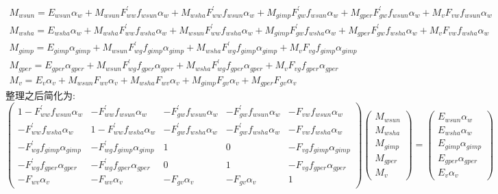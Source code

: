 \begin{landscape}
\begin{equation}
\begin{array}{l}M_{wsun}=E_{wsun} \alpha_{w}+M_{wsun} F_{ww}^{\prime} f_{wsun} \alpha_{w}+M_{wsha} F_{ww}^{\prime} f_{wsun} \alpha_{w}+M_{gimp} F_{g w}^{\prime} f_{wsun} \alpha_{w}+M_{gper} F_{g w}^{\prime} f_{wsun} \alpha_{w}+M_{v} F_{v w} f_{wsun} \alpha_{w} \\ M_{wsha}=E_{wsha} \alpha_{w}+M_{wsha} F_{ww}^{\prime} f_{wsha} \alpha_{w}+M_{wsun} F_{ww}^{\prime} f_{wsha} \alpha_{w}+M_{gimp} F_{g w}^{\prime} f_{wsha} \alpha_{w}+M_{gper} F_{g w}^{\prime} f_{wsha} \alpha_{w}+M_{v} F_{v w} f_{wsha} \alpha_{w} \\ M_{gimp}=E_{gimp} \alpha_{gimp}+M_{wsun} F_{w g}^{\prime} f_{gimp} \alpha_{gimp}+M_{wsha} F_{w g}^{\prime} f_{gimp} \alpha_{gimp}+M_{v} F_{v g} f_{gimp} \alpha_{gimp} \\ M_{gper}=E_{gper} \alpha_{gper}+M_{wsun} F_{w g}^{\prime} f_{gper} \alpha_{gper}+M_{wsha} F_{w g}^{\prime} f_{gper} \alpha_{gper}+M_{v} F_{v g} f_{gper} \alpha_{gper} \\ M_{v}=E_{v} \alpha_{v}+M_{wsun} F_{w v} \alpha_{v}+M_{wsha} F_{w v} \alpha_{v}+M_{gimp} F_{g v} \alpha_{v}+M_{gper} F_{g v} \alpha_{v}\end{array}
\end{equation}
整理之后简化为:
\begin{equation}
\left(\begin{array}{ccccc}1-F_{ww}^{\prime} f_{wsun} \alpha_{w} & -F_{ww}^{\prime} f_{wsun} \alpha_{w} & -F_{g w}^{\prime} f_{wsun} \alpha_{w} & -F_{g w}^{\prime} f_{wsun} \alpha_{w} & -F_{v w} f_{wsun} \alpha_{w} \\ -F_{ww}^{\prime} f_{wsha} \alpha_{w} & 1-F_{ww}^{\prime} f_{wsha} \alpha_{w} & -F_{g w}^{\prime} f_{wsha} \alpha_{w} & -F_{g w}^{\prime} f_{wsha} \alpha_{w} & -F_{v w} f_{wsha} \alpha_{w} \\ -F_{w g}^{\prime} f_{gimp} \alpha_{gimp} & -F_{w g}^{\prime} f_{gimp} \alpha_{gimp} & 1 & 0 & -F_{v g} f_{gimp} \alpha_{gimp} \\ -F_{w g}^{\prime} f_{gper} \alpha_{gper} & -F_{w g}^{\prime} f_{gper} \alpha_{gper} & 0 & 1 & -F_{v g} f_{gper} \alpha_{gper} \\ -F_{w v} \alpha_{v} & -F_{w v} \alpha_{v} & -F_{g v} \alpha_{v} & -F_{g v} \alpha_{v} & 1\end{array}\right)\left(\begin{array}{c}M_{wsun} \\ M_{wsha} \\ M_{gimp} \\ M_{gper} \\ M_{v}\end{array}\right)=\left(\begin{array}{c}E_{wsun} \alpha_{w} \\ E_{wsha} \alpha_{w} \\ E_{gimp} \alpha_{gimp} \\ E_{gper} \alpha_{gper} \\ E_{v} \alpha_{v}\end{array}\right)
\end{equation}
\end{landscape}
